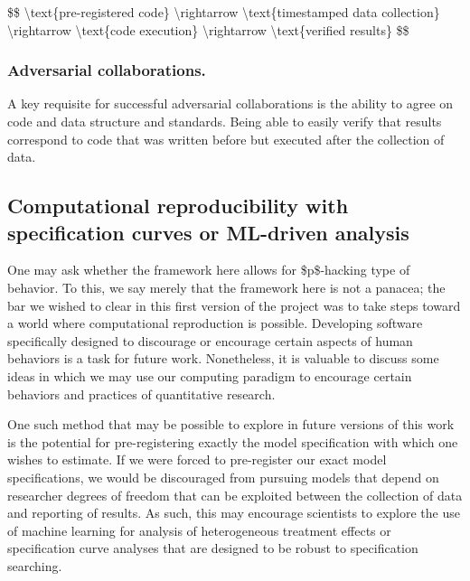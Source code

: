 \$\$ \textbackslash{}text\{pre-registered code\} \textbackslash{}rightarrow \textbackslash{}text\{timestamped data collection\} \textbackslash{}rightarrow \textbackslash{}text\{code execution\} \textbackslash{}rightarrow \textbackslash{}text\{verified results\} \$\$

\hypertarget{adversarial-collaborations.}{%
\subsubsection{Adversarial collaborations.}\label{adversarial-collaborations.}}

A key requisite for successful adversarial collaborations is the ability to agree on code and data structure and standards. Being able to easily verify that results correspond to code that was written before but executed after the collection of data.

\hypertarget{computational-reproducibility-with-specification-curves-or-ml-driven-analysis}{%
\subsection{Computational reproducibility with specification curves or ML-driven analysis}\label{computational-reproducibility-with-specification-curves-or-ml-driven-analysis}}

One may ask whether the framework here allows for \$p\$-hacking type of behavior. To this, we say merely that the framework here is not a panacea; the bar we wished to clear in this first version of the project was to take steps toward a world where computational reproduction is possible. Developing software specifically designed to discourage or encourage certain aspects of human behaviors is a task for future work. Nonetheless, it is valuable to discuss some ideas in which we may use our computing paradigm to encourage certain behaviors and practices of quantitative research.

One such method that may be possible to explore in future versions of this work is the potential for pre-registering exactly the model specification with which one wishes to estimate. If we were forced to pre-register our exact model specifications, we would be discouraged from pursuing models that depend on researcher degrees of freedom that can be exploited between the collection of data and reporting of results. As such, this may encourage scientists to explore the use of machine learning for analysis of heterogeneous treatment effects or specification curve analyses that are designed to be robust to specification searching. 

